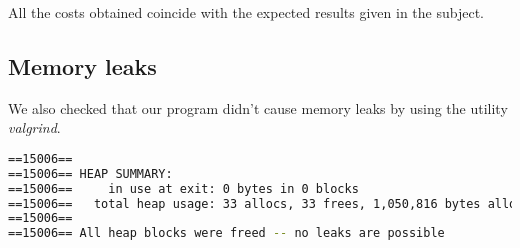 All the costs obtained coincide with the expected results given in the subject.

\subsection{Memory leaks}

We also checked that our program didn't cause memory leaks by using the utility \textit{valgrind}.

\begin{lstlisting}[language=bash, frame=shadowbox, breaklines=true]
==15006== 
==15006== HEAP SUMMARY:
==15006==     in use at exit: 0 bytes in 0 blocks
==15006==   total heap usage: 33 allocs, 33 frees, 1,050,816 bytes allocated
==15006== 
==15006== All heap blocks were freed -- no leaks are possible
\end{lstlisting}
